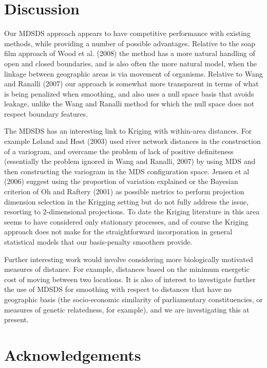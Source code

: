 \documentclass[useAMS, referee]{biom}
\begin{document}
\section{Discussion}
\label{conclusion}

Our MDSDS approach appears to have competitive performance with existing methods, while providing a number of possible advantages. Relative to the soap film approach of Wood et al. (2008) the method has a more natural handling of open and closed boundaries, and is also often the more natural model, when the linkage between geographic areas is via movement of organisms. Relative to Wang and Ranalli (2007) our approach is somewhat more transparent in terms of what is being penalized when smoothing, and also uses a null space basis that avoids leakage, unlike the Wang and Ranalli method for which the null space does not respect boundary features. 

The MDSDS has an interesting link to Kriging with within-area distances. For example L{\o}land and H{\o}st (2003) used river network distances in the construction of a variogram, and overcame the problem of lack of positive definiteness (essentially the problem ignored in Wang and Ranalli, 2007) by using MDS and then constructing the variogram in the MDS configuration space. Jensen et al (2006) suggest using the proportion of variation explained or the Bayesian criterion of Oh and Raftery (2001) as possible metrics to perform projection dimension selection in the Krigging setting but do not fully address the issue, resorting to 2-dimensional projections. To date the Kriging literature in this area seems to have considered only stationary processes, and of course the Kriging approach does not make for the straightforward incorporation in general statistical models that our basis-penalty smoothers provide. 

Further interesting work would involve considering more biologically motivated measures of distance. For example, distances based on the minimum energetic cost of moving between  two locations. It is also of interest to investigate further the use of MDSDS for smoothing with respect to distances that have no geographic basis (the socio-economic similarity of parliamentary constituencies, or measures of genetic relatedness, for example), and we are investigating this at present.

\section*{Acknowledgements}
\end{document}
